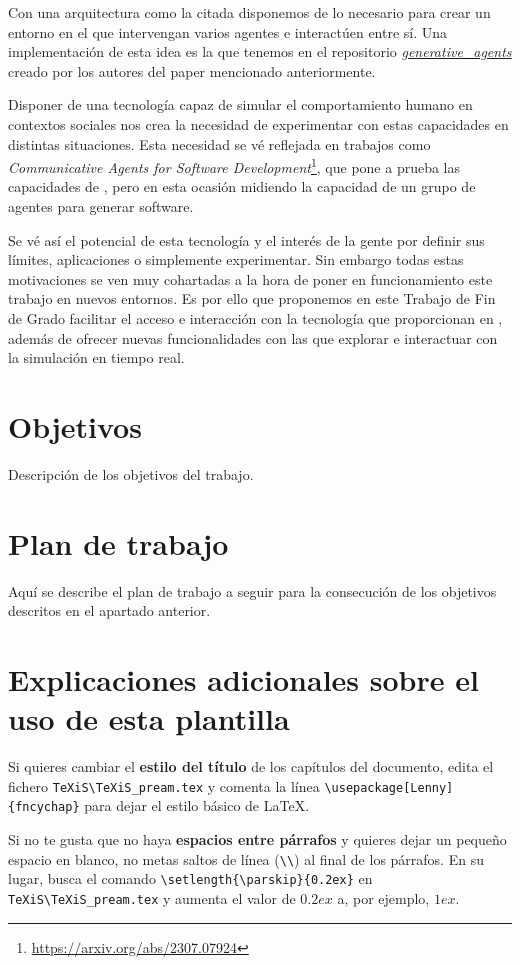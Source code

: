 Con una arquitectura como la citada disponemos de lo necesario para crear un entorno en el que intervengan varios agentes e interactúen entre sí. Una implementación de esta idea es la que tenemos en el repositorio \href{https://github.com/joonspk-research/generative_agents}{\textit{generative\_agents}} creado por los autores del paper mencionado anteriormente.

Disponer de una tecnología capaz de simular el comportamiento humano en contextos sociales nos crea la necesidad de experimentar con estas capacidades en distintas situaciones. Esta necesidad se vé reflejada en trabajos como \textit{Communicative Agents for Software Development}\footnote{\url{https://arxiv.org/abs/2307.07924}}, que pone a prueba las capacidades de \ga, pero en esta ocasión midiendo la capacidad de un grupo de agentes para generar software.

Se vé así el potencial de esta tecnología y el interés de la gente por definir sus límites, aplicaciones o simplemente experimentar.
Sin embargo todas estas motivaciones se ven muy cohartadas a la hora de poner en funcionamiento este trabajo en nuevos entornos.
Es por ello que proponemos en este Trabajo de Fin de Grado facilitar el acceso e interacción con la tecnología que proporcionan en \ga, además de ofrecer nuevas funcionalidades con las que explorar e interactuar con la simulación en tiempo real.

\section{Objetivos}
Descripción de los objetivos del trabajo.


\section{Plan de trabajo}
Aquí se describe el plan de trabajo a seguir para la consecución de los objetivos descritos en el apartado anterior.



\section{Explicaciones adicionales sobre el uso de esta plantilla}
Si quieres cambiar el \textbf{estilo del título} de los capítulos del documento, edita el fichero \verb|TeXiS\TeXiS_pream.tex| y comenta la línea \verb|\usepackage[Lenny]{fncychap}| para dejar el estilo básico de \LaTeX.

Si no te gusta que no haya \textbf{espacios entre párrafos} y quieres dejar un pequeño espacio en blanco, no metas saltos de línea (\verb|\\|) al final de los párrafos. En su lugar, busca el comando  \verb|\setlength{\parskip}{0.2ex}| en \verb|TeXiS\TeXiS_pream.tex| y aumenta el valor de $0.2ex$ a, por ejemplo, $1ex$.

